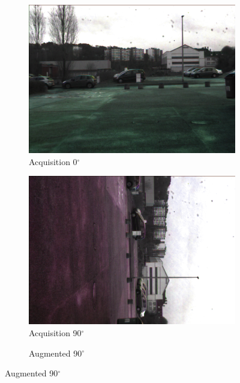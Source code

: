 \begin{figure}[h]
	\centering
	\begin{subfigure}[b]{0.3\linewidth}  
		\centering 
		\caption{Acquisition 0$^\circ$}
		\includegraphics[width=\linewidth]{Figures/Aug/exprimentalTest/phys0.png}
	\end{subfigure}
	\begin{subfigure}[b]{0.3\linewidth}   
		\centering 
		\caption{Acquisition 90$^\circ$}
		\includegraphics[width=\linewidth]{Figures/Aug/exprimentalTest/phys90.png}
	\end{subfigure}
	\begin{subfigure}[b]{0.3\linewidth}   
		\centering 
		\caption{Augmented 90$^\circ$}

\end{subfigure}
\end{figure}
